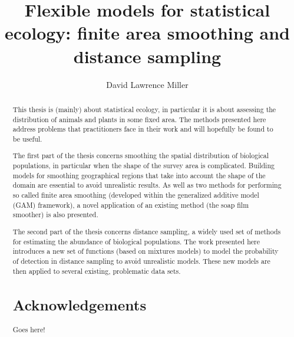 \documentclass[12pt]{report}
\title{Flexible models for statistical ecology: finite area smoothing and distance sampling}
\author{David Lawrence Miller}
\begin{document}
\maketitle
\begin{abstract} 
This thesis is (mainly) about statistical ecology, in particular it is about assessing the distribution of animals and plants in some fixed area. The methods presented here address problems that practitioners face in their work and will hopefully be found to be useful. 

The first part of the thesis concerns smoothing the spatial distribution of biological populations, in particular when the shape of the survey area is complicated. Building models for smoothing geographical regions that take into account the shape of the domain are essential to avoid unrealistic results. As well as two methods for performing so called finite area smoothing (developed within the generalized additive model (GAM) framework), a novel application of an existing method (the soap film smoother) is also presented.

The second part of the thesis concerns distance sampling, a widely used set of methods for estimating the abundance of biological populations. The work presented here introduces a new set of functions (based on mixtures models) to model the probability of detection in distance sampling to avoid unrealistic models. These new models are then applied to several existing, problematic data sets.

\begin{center}
\section*{Acknowledgements}
\end{center}
Goes here!










\end{abstract}
\end{document}
